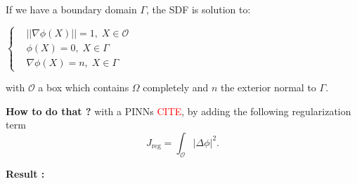 {\begin{center}
\begin{minipage}{0.48\linewidth}
\begin{tcolorbox}
                \begin{tcolorbox}[
                    colback=color1!30, %
                    colframe=color2, %
                    arc=2mm, %
                    boxrule=0.5pt, %
                    breakable, enhanced jigsaw,
                    width=\linewidth
                    ]
                    
                    \textbf{} If we have a boundary domain $\Gamma$, the SDF is solution to:
                    
                    \begin{minipage}{0.7\linewidth}
                        \hspace{350pt}
                        $\left\{\begin{aligned}
                            &||\nabla\phi(X)||=1, \; X\in\mathcal{O} \\
                            &\phi(X)=0, \; X\in\Gamma \\
                            &\nabla\phi(X)=n, \; X\in\Gamma
                        \end{aligned}\right.$
                    \end{minipage}
                    \begin{minipage}{0.25\linewidth}
                        \centering
                    \end{minipage}
                    
                    with $\mathcal{O}$ a box which contains $\Omega$ completely and $n$ the exterior normal to $\Gamma$.
                \end{tcolorbox}
                
                \textbf{How to do that ?} with a PINNs \textcolor{red}{CITE}, by adding the following regularization term
                \vspace{-5pt}
                \begin{equation*}
                    J_{\text{reg}} = \int_\mathcal{O} |\Delta\phi|^2.
                \end{equation*} 
            \end{tcolorbox}
        \end{minipage}	
        \qquad
        \begin{minipage}{0.48\linewidth}
            \centering
            \begin{tcolorbox}[
                colback=color1!50, %
                colframe=color2, %
                arc=2mm, %
                boxrule=2pt, %
                breakable, enhanced jigsaw,
                width=\linewidth
                ]            
                \textbf{Result :} \textbf{}
                

\end{tcolorbox}
\end{minipage}
\end{center}}
